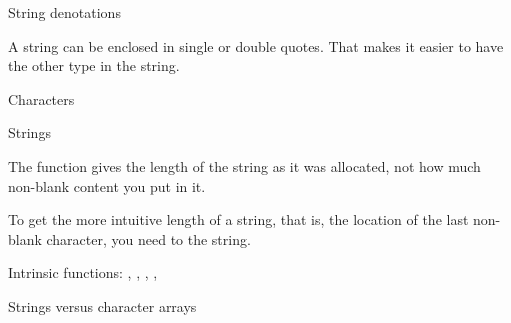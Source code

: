 
 {String denotations}

A string can be enclosed in single or double quotes. That makes it
easier to have the other type in the string.


 {Characters}

 {Strings}

The  function gives the length of the string as
it was allocated, not how much non-blank content you put in it.


To get the more intuitive length of a string, that is, the location of
the last non-blank character, you need to  the string.

Intrinsic functions: ,
,
, ,


 {Strings versus character arrays}

